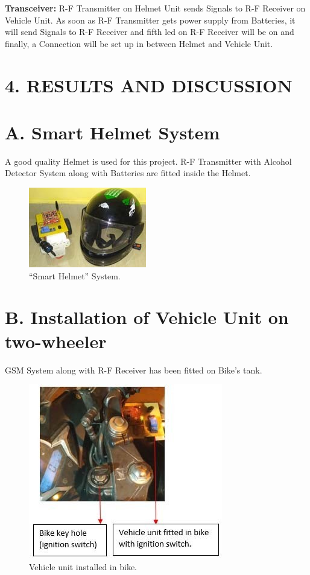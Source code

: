 \textbf{Transceiver: }R-F Transmitter on Helmet Unit sends Signals to R-F Receiver on Vehicle Unit. As soon as R-F Transmitter gets power supply from Batteries, it will send Signals to R-F Receiver and fifth led on R-F Receiver will be on and finally, a Connection will be set up in between Helmet and Vehicle Unit.

\section*{4. RESULTS AND DISCUSSION}
\section*{A.	Smart Helmet System }
A good quality Helmet is used for this project. R-F Transmitter with Alcohol Detector System along with Batteries are fitted inside the Helmet.
\begin{figure}[h]
	\centering
	\includegraphics[width=0.7\linewidth]{images/dsfs}
	\captionsetup{labelformat=empty}
	\caption[]{“Smart Helmet” System.}
\end{figure}

\section*{B. Installation of Vehicle Unit on two-wheeler }
GSM System along with R-F Receiver has been fitted on Bike’s tank. 
\begin{figure}[h]
	\centering
	\includegraphics[width=0.7\linewidth]{images/bhjb}
	\captionsetup{labelformat=empty}
	\caption[]{Vehicle unit installed in bike.}
\end{figure}

